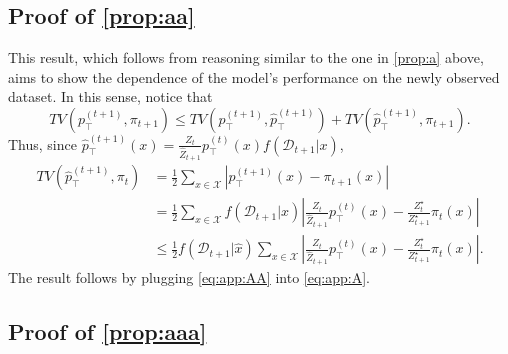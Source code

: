 \documentclass{article}
\theoremstyle{plain}
\theoremstyle{definition}
\theoremstyle{remark}
\theoremstyle{remark}
\begin{document}
\subsection{Proof of \autoref{prop:aa}} 

This result, which follows from reasoning similar to the one in \autoref{prop:a} above, aims to show the dependence of the model's performance on the newly observed dataset. In this sense, notice that  
\begin{equation} \label{eq:app:A} 
    TV\left(p_{\top}^{(t + 1)}, \pi_{t + 1}\right) \le TV\left(p_{\top}^{(t + 1)}, \hat{p}_{\top}^{(t + 1)} \right) + TV\left(\hat{p}_{\top}^{(t + 1)}, \pi_{t + 1}\right).  
\end{equation}
Thus, since $\hat{p}_{\top}^{(t + 1)}(x) = \frac{Z_{t}}{\hat{Z}_{t + 1}} p_{\top}^{(t)}(x) f(\mathcal{D}_{t + 1} | x)$, 
\begin{equation} \label{eq:app:AA}
    \begin{aligned} 
        TV\left(\hat{p}_{\top}^{(t + 1)}, \pi_{t}\right) &= \frac{1}{2} \sum_{x \in \mathcal{X}} \left|p_{\top}^{(t + 1)}(x) - \pi_{t + 1}(x)\right| \\ 
        &= \frac{1}{2} \sum_{x \in \mathcal{X}} f(\mathcal{D}_{t + 1} | x) \left|\frac{Z_{t}}{\hat{Z}_{t + 1}} p_{\top}^{(t)}(x) - \frac{Z_{t}^{\star}}{Z_{t + 1}^{\star}} \pi_{t}(x)\right| \\ 
        &\le \frac{1}{2} f(\mathcal{D}_{t + 1} | \hat{x}) \sum_{x \in \mathcal{X}} \left| \frac{Z_{t}}{\hat{Z}_{t + 1}} p_{\top}^{(t)}(x) - \frac{Z_{t}^{\star}}{Z_{t + 1}^{\star}} \pi_{t}(x) \right|. 
    \end{aligned} 
\end{equation}
The result follows by plugging \autoref{eq:app:AA} into \autoref{eq:app:A}. 

\subsection{Proof of \autoref{prop:aaa}} 
\end{document}
